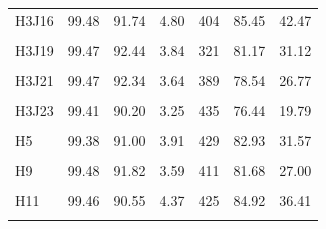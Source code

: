 \documentclass[
  a4paper,
  titlepage]{article}
\begin{document}
\begin{longtable}[t]{lllllll}
H3J16 & 99.48 & 91.74 & 4.80 & 404 & 85.45 & 42.47\\
 
\cellcolor{gray!6}{H3J18} & \cellcolor{gray!6}{99.45} & \cellcolor{gray!6}{89.80} & \cellcolor{gray!6}{3.81} & \cellcolor{gray!6}{448} & \cellcolor{gray!6}{82.47} & \cellcolor{gray!6}{28.18}\\
 
H3J19 & 99.47 & 92.44 & 3.84 & 321 & 81.17 & 31.12\\
 
\cellcolor{gray!6}{H3J20} & \cellcolor{gray!6}{98.89} & \cellcolor{gray!6}{92.23} & \cellcolor{gray!6}{4.20} & \cellcolor{gray!6}{334} & \cellcolor{gray!6}{84.20} & \cellcolor{gray!6}{38.30}\\
 
H3J21 & 99.47 & 92.34 & 3.64 & 389 & 78.54 & 26.77\\
 
\cellcolor{gray!6}{H3J22} & \cellcolor{gray!6}{99.46} & \cellcolor{gray!6}{91.80} & \cellcolor{gray!6}{4.06} & \cellcolor{gray!6}{409} & \cellcolor{gray!6}{82.66} & \cellcolor{gray!6}{33.44}\\
 
H3J23 & 99.41 & 90.20 & 3.25 & 435 & 76.44 & 19.79\\
 
\cellcolor{gray!6}{H4} & \cellcolor{gray!6}{99.40} & \cellcolor{gray!6}{90.40} & \cellcolor{gray!6}{4.28} & \cellcolor{gray!6}{423} & \cellcolor{gray!6}{82.22} & \cellcolor{gray!6}{33.30}\\
 
H5 & 99.38 & 91.00 & 3.91 & 429 & 82.93 & 31.57\\
 
\cellcolor{gray!6}{H8} & \cellcolor{gray!6}{99.47} & \cellcolor{gray!6}{89.98} & \cellcolor{gray!6}{3.65} & \cellcolor{gray!6}{437} & \cellcolor{gray!6}{79.67} & \cellcolor{gray!6}{25.21}\\
 
H9 & 99.48 & 91.82 & 3.59 & 411 & 81.68 & 27.00\\
 
\cellcolor{gray!6}{H10} & \cellcolor{gray!6}{99.44} & \cellcolor{gray!6}{91.31} & \cellcolor{gray!6}{4.46} & \cellcolor{gray!6}{411} & \cellcolor{gray!6}{85.92} & \cellcolor{gray!6}{39.82}\\
 
H11 & 99.46 & 90.55 & 4.37 & 425 & 84.92 & 36.41\\
 
\cellcolor{gray!6}{H13} & \cellcolor{gray!6}{99.42} & \cellcolor{gray!6}{91.35} & \cellcolor{gray!6}{4.47} & \cellcolor{gray!6}{404} & \cellcolor{gray!6}{84.32} & \cellcolor{gray!6}{38.74}\\
 

\end{longtable}
\end{document}
